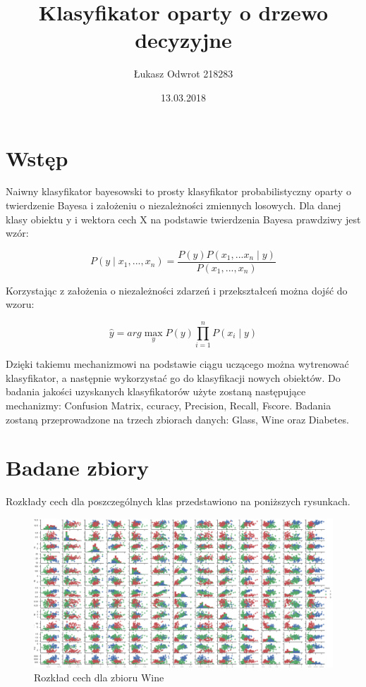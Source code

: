 \documentclass[12pt,a4paper]{article}
\title{Klasyfikator oparty o drzewo decyzyjne}
\date{13.03.2018}
\author{Łukasz Odwrot 218283}
\begin{document}
\maketitle
\thispagestyle{empty}
\newpage
\tableofcontents
\setcounter{page}{1}
\newpage

\section{Wstęp}
Naiwny klasyfikator bayesowski to prosty klasyfikator probabilistyczny oparty o twierdzenie Bayesa i założeniu o niezależności zmiennych losowych.  Dla danej klasy obiektu y i wektora cech X na podstawie twierdzenia Bayesa prawdziwy jest wzór:


$$ P(y\mid x_{1},..., x_{n}) = 
\frac
{P(y)P(x_{1},...x_{n}\mid y)}
{P(x_{1},...,x_{n})}
$$

Korzystając z założenia o niezależności zdarzeń i przekształceń można dojść do wzoru:

$$  \hat{y} = arg \max_{y} P(y) \prod_{i=1}^{n} P(x_{i} \mid y) $$

Dzięki takiemu mechanizmowi na podstawie ciągu uczącego można wytrenować klasyfikator, a następnie wykorzystać go do klasyfikacji nowych obiektów. Do badania jakości uzyskanych klasyfikatorów użyte zostaną następujące mechanizmy: Confusion Matrix, ccuracy, Precision, Recall, Fscore. Badania zostaną przeprowadzone na trzech zbiorach danych: Glass, Wine oraz Diabetes.

\section{Badane zbiory}

Rozkłady cech dla poszczególnych klas przedstawiono na poniższych rysunkach.

\begin{figure}[H]
\centering
\includegraphics[width=1\textwidth]{dsWineCombined.png}
\caption{Rozkład cech dla zbioru Wine}
\end{figure}
\end{document}
